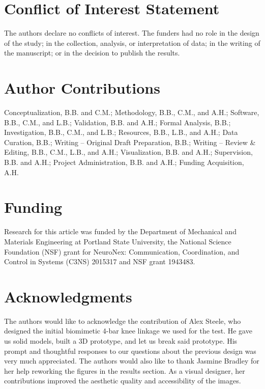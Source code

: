 \documentclass[utf8]{FrontiersinHarvard} %
\begin{document}
\section*{Conflict of Interest Statement}
The authors declare no conflicts of interest. The funders had no role in the design of the study; in the collection, analysis, or interpretation of data; in the writing of the manuscript; or in the decision to publish the results.

\section*{Author Contributions}
Conceptualization, B.B. and C.M.; Methodology, B.B., C.M., and A.H.; Software, B.B., C.M., and L.B.; Validation, B.B. and A.H.; Formal Analysis, B.B.; Investigation, B.B., C.M., and L.B.; Resources, B.B., L.B., and A.H.; Data Curation, B.B.; Writing – Original Draft Preparation, B.B.; Writing – Review \& Editing, B.B., C.M., L.B., and A.H.; Visualization, B.B. and A.H.; Supervision, B.B. and A.H.; Project Administration, B.B. and A.H.; Funding Acquisition, A.H.

\section*{Funding}
Research for this article was funded by the Department of Mechanical and Materials Engineering at Portland State University, the National Science Foundation (NSF) grant for NeuroNex: Communication, Coordination, and Control in Systems (C3NS) 2015317 and NSF grant 1943483. 


\section*{Acknowledgments}
The authors would like to acknowledge the contribution of Alex Steele, who designed the initial biomimetic 4-bar knee linkage we used for the test. He gave us solid models, built a 3D prototype, and let us break said prototype. His prompt and thoughtful responses to our questions about the previous design was very much appreciated. The authors would also like to thank Jasmine Bradley for her help reworking the figures in the results section. As a visual designer, her contributions improved the aesthetic quality and accessibility of the images. 
\end{document}

